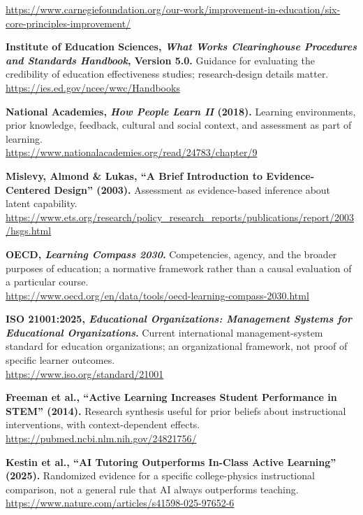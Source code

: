 \begin{enumerate}[label={[\textbf{M\arabic*}]}, leftmargin=2em, itemsep=0.6em]
    \url{https://www.carnegiefoundation.org/our-work/improvement-in-education/six-core-principles-improvement/}
    \item \textbf{Institute of Education Sciences, \emph{What Works Clearinghouse Procedures and Standards Handbook}, Version 5.0.} Guidance for evaluating the credibility of education effectiveness studies; research-design details matter. \\
    \url{https://ies.ed.gov/ncee/wwc/Handbooks}
    \item \textbf{National Academies, \emph{How People Learn II} (2018).} Learning environments, prior knowledge, feedback, cultural and social context, and assessment as part of learning. \\
    \url{https://www.nationalacademies.org/read/24783/chapter/9}
    \item \textbf{Mislevy, Almond \& Lukas, ``A Brief Introduction to Evidence-Centered Design'' (2003).} Assessment as evidence-based inference about latent capability. \\
    \url{https://www.ets.org/research/policy_research_reports/publications/report/2003/hsgs.html}
    \item \textbf{OECD, \emph{Learning Compass 2030}.} Competencies, agency, and the broader purposes of education; a normative framework rather than a causal evaluation of a particular course. \\
    \url{https://www.oecd.org/en/data/tools/oecd-learning-compass-2030.html}
    \item \textbf{ISO 21001:2025, \emph{Educational Organizations: Management Systems for Educational Organizations}.} Current international management-system standard for education organizations; an organizational framework, not proof of specific learner outcomes. \\
    \url{https://www.iso.org/standard/21001}
    \item \textbf{Freeman et al., ``Active Learning Increases Student Performance in STEM'' (2014).} Research synthesis useful for prior beliefs about instructional interventions, with context-dependent effects. \\
    \url{https://pubmed.ncbi.nlm.nih.gov/24821756/}
    \item \textbf{Kestin et al., ``AI Tutoring Outperforms In-Class Active Learning'' (2025).} Randomized evidence for a specific college-physics instructional comparison, not a general rule that AI always outperforms teaching. \\
    \url{https://www.nature.com/articles/s41598-025-97652-6}

\end{enumerate}
